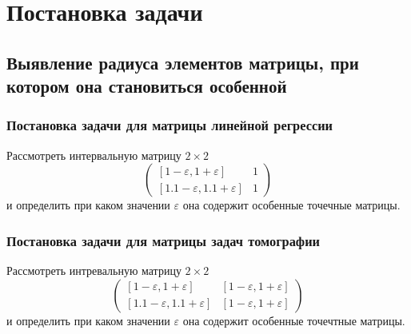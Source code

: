 \documentclass[a4paper,12pt]{article}
\begin{document}
    
    \newpage

    \tableofcontents
    \newpage

    \section{Постановка задачи}

    \subsection{Выявление радиуса элементов матрицы, при котором она становиться особенной}
    \subsubsection{Постановка задачи для матрицы линейной регрессии}
    Рассмотреть интервальную матрицу $ 2 \times 2 $ \newline
    \begin{equation}
        \begin{pmatrix}
            [1 - \varepsilon, 1 + \varepsilon] & 1\\
            [1.1 - \varepsilon, 1.1 + \varepsilon] & 1
        \end{pmatrix}
        \label{eq:1}
    \end{equation}
    и определить при каком значении $ \varepsilon $ она содержит особенные точечные матрицы.

    \subsubsection{Постановка задачи для матрицы задач томографии}
    Рассмотреть интревальную матрицу $ 2 \times 2 $ \newline
    \begin{equation}
        \begin{pmatrix}
            [1 - \varepsilon, 1 + \varepsilon] & [1 - \varepsilon, 1 + \varepsilon]\\
            [1.1 - \varepsilon, 1.1 + \varepsilon] & [1 - \varepsilon, 1 + \varepsilon]
        \end{pmatrix}
        \label{eq:2}
    \end{equation}
    и определить при каком значении $ \varepsilon $ она содержит особенные точечтные матрицы.
\end{document}
